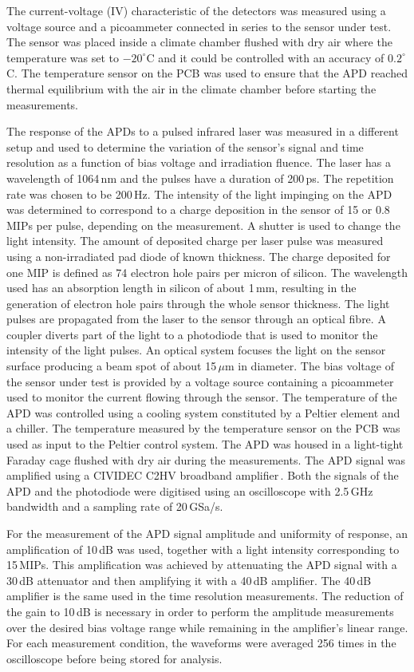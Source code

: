\documentclass{article}
\begin{document}
The current-voltage (IV) characteristic of the detectors was measured using a voltage source and a picoammeter connected in series to the sensor under test.
The sensor was placed inside a climate chamber flushed with dry air where the temperature was set to $-20^\circ$C and it could be controlled with an accuracy of $0.2^\circ$C.
The temperature sensor on the PCB was used to ensure that the APD reached thermal equilibrium with the air in the climate chamber before starting the measurements.

The response of the APDs to a pulsed infrared laser was measured in a different setup and used to determine the variation of the sensor's signal and time resolution as a function of bias voltage and irradiation fluence.
The laser has a wavelength of 1064\,nm and the pulses have a duration of 200\,ps.
The repetition rate was chosen to be 200\,Hz.
The intensity of the light impinging on the APD was determined to correspond to a charge deposition in the sensor of 15 or 0.8\,MIPs per pulse, depending on the measurement.
A shutter is used to change the light intensity.
The amount of deposited charge per laser pulse was measured using a non-irradiated pad diode of known thickness.
The charge deposited for one MIP is defined as 74 electron hole pairs per micron of silicon.
The wavelength used has an absorption length in silicon of about 1\,mm, resulting in the generation of electron hole pairs through the whole sensor thickness.
The light pulses are propagated from the laser to the sensor through an optical fibre.
A coupler diverts part of the light to a photodiode that is used to monitor the intensity of the light pulses.
An optical system focuses the light on the sensor surface producing a beam spot of about 15\,$\mu$m in diameter.
The bias voltage of the sensor under test is provided by a voltage source containing a picoammeter used to monitor the current flowing through the sensor.
The temperature of the APD was controlled using a cooling system constituted by a Peltier element and a chiller.
The temperature measured by the temperature sensor on the PCB was used as input to the Peltier control system.
The APD was housed in a light-tight Faraday cage flushed with dry air during the measurements.
The APD signal was amplified using a CIVIDEC C2HV broadband amplifier\,\cite{cividec}.
Both the signals of the APD and the photodiode were digitised using an oscilloscope with 2.5\,GHz bandwidth and a sampling rate of 20\,GSa/s.

For the measurement of the APD signal amplitude and uniformity of response, an amplification of 10\,dB was used, together with a light intensity corresponding to 15\,MIPs.
This amplification was achieved by attenuating the APD signal with a 30\,dB attenuator and then amplifying it with a 40\,dB amplifier.
The 40\,dB amplifier is the same used in the time resolution measurements.
The reduction of the gain to 10\,dB is necessary in order to perform the amplitude measurements over the desired bias voltage range while remaining in the amplifier's linear range.
For each measurement condition, the waveforms were averaged 256 times in the oscilloscope before being stored for analysis.
\end{document}
